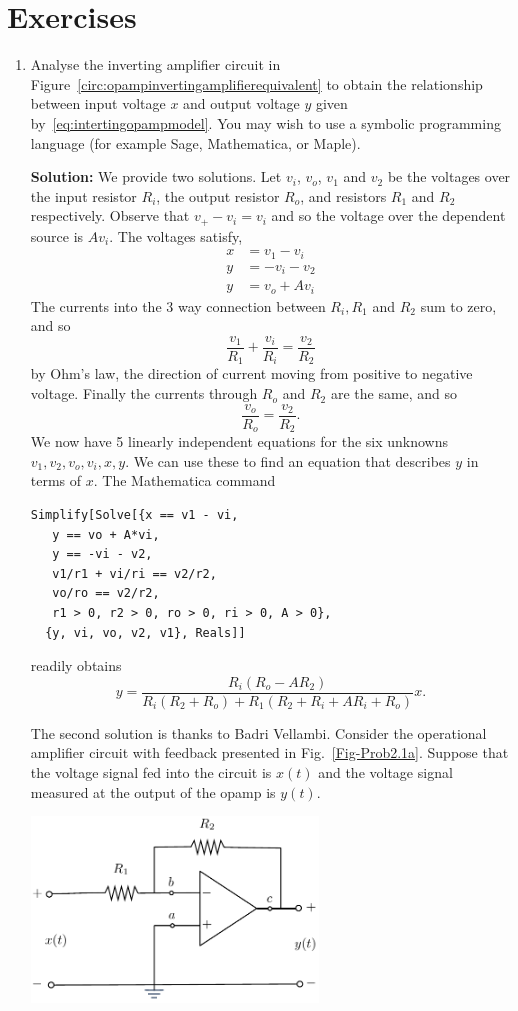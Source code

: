 \documentclass[11pt,a4paper]{book}
\theoremstyle{plain}
\numberwithin{equation}{section}
\newenvironment{solution}{\begin{footnotesize}\textbf{Solution:}}{\end{footnotesize}}
\newenvironment{excersizelist}{%
  \renewcommand*{\theenumi}{\thechapter.\arabic{enumi}}%
  \newcommand\itemadvanced{\stepcounter{enumi}\item[$\ast$\, \theenumi.]}
  \begin{enumerate}
}{%
  \end{enumerate}
}
\begin{document}
\section{Exercises}

\begin{excersizelist}

\item \label{exer:multiplieropampwithmodel}  Analyse the inverting amplifier circuit in Figure~\ref{circ:opampinvertingamplifierequivalent} to obtain the relationship between input voltage $x$ and output voltage $y$ given by~\eqref{eq:intertingopampmodel}.  You may wish to use a symbolic programming language (for example Sage, Mathematica, or Maple).
\begin{solution}
We provide two solutions.  Let $v_i$, $v_o$, $v_1$ and $v_2$ be the voltages over the input resistor $R_i$, the output resistor $R_o$, and resistors $R_1$ and $R_2$ respectively.  Observe that $v_+ - v_i = v_i$ and so the voltage over the dependent source is $A v_i$.  The voltages satisfy,
\begin{align*}
x &= v_1 - v_i \\
y &= -v_i - v_2 \\
y &=  v_o + Av_i
\end{align*}
The currents into the 3 way connection between $R_i, R_1$ and $R_2$ sum to zero, and so
\[
\frac{v_1}{R_1} + \frac{v_i}{R_i} = \frac{v_2}{R_2}
\]
by Ohm's law, the direction of current moving from positive to negative voltage.  Finally the currents through $R_o$ and $R_2$ are the same, and so
\[
\frac{v_o}{R_o} = \frac{v_2}{R_2}.
\]
We now have 5 linearly independent equations for the six unknowns $v_1, v_2, v_o, v_i, x, y$.  We can use these to find an equation that describes $y$ in terms of $x$.  The Mathematica command
\begin{verbatim}
Simplify[Solve[{x == v1 - vi,
   y == vo + A*vi,
   y == -vi - v2,
   v1/r1 + vi/ri == v2/r2,
   vo/ro == v2/r2,
   r1 > 0, r2 > 0, ro > 0, ri > 0, A > 0},
  {y, vi, vo, v2, v1}, Reals]]
\end{verbatim}
readily obtains
\[
y = \frac{R_i (R_o - A R_2) }{R_i (R_2+R_o)+R_1 (R_2+R_i + A R_i+R_o)}x.
\]

The second solution is thanks to Badri Vellambi.  Consider the operational amplifier circuit with feedback presented in Fig.~\ref{Fig-Prob2.1a}. Suppose that the voltage signal fed into the circuit is $x(t)$ and the voltage signal measured at the output of the opamp is $y(t)$. 

{
\centering
\captionsetup{type=figure}
\includegraphics[width=3in]{plots/multiplierbadri1.pdf}
 \label{Fig-Prob2.1a}
}


\end{solution}
\end{excersizelist}
\end{document}
